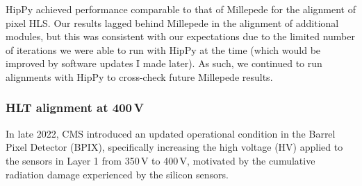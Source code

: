 HipPy achieved performance comparable to that of Millepede for the alignment of pixel HLS. Our results lagged behind Millepede in the alignment of additional modules, but this was consistent with our expectations due to the limited number of iterations we were able to run with HipPy at the time (which would be improved by software updates I made later). As such, we continued to run alignments with HipPy to cross-check future Millepede results. 







\subsubsection{HLT alignment at 400\,V}



In late 2022, CMS introduced an updated operational condition in the Barrel Pixel Detector (BPIX), specifically increasing the high voltage (HV) applied to the sensors in Layer 1 from 350\,V to 400\,V, motivated by the cumulative radiation damage experienced by the silicon sensors. 


